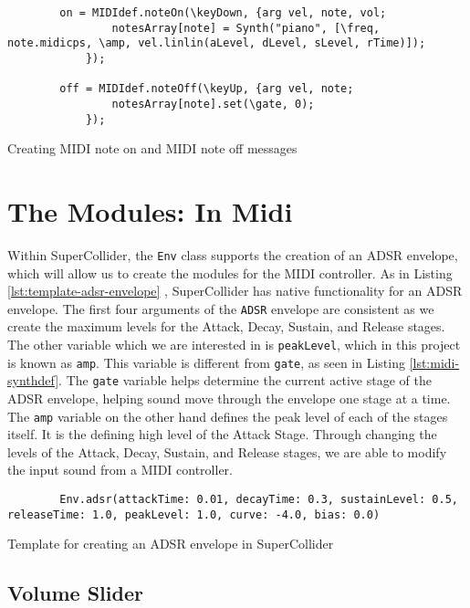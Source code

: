\begin{listing}
	\begin{lstlisting}
		on = MIDIdef.noteOn(\keyDown, {arg vel, note, vol;
				notesArray[note] = Synth("piano", [\freq, note.midicps, \amp, vel.linlin(aLevel, dLevel, sLevel, rTime)]);
			});

		off = MIDIdef.noteOff(\keyUp, {arg vel, note;
				notesArray[note].set(\gate, 0);
			});
	\end{lstlisting}
	\caption{Creating MIDI note on and MIDI note off messages}
	\label{lst:midi-note-on-and-off}	
\end{listing}


\section{The Modules: In Midi}\label{section:the-modules-midi}

Within SuperCollider, the \texttt{Env} class supports the creation of an ADSR envelope, which will allow us to create the modules for the MIDI controller. As in Listing \ref{lst:template-adsr-envelope}  \cite{McCartney_2021}, SuperCollider has native functionality for an ADSR envelope. The first four arguments of the \texttt{ADSR} envelope are consistent as we create the maximum levels for the Attack, Decay, Sustain, and Release stages. The other variable which we are interested in is \texttt{peakLevel}, which in this project is known as \texttt{amp}. This variable is different from \texttt{gate}, as seen in Listing \ref{lst:midi-synthdef}. The \texttt{gate} variable helps determine the current active stage of the ADSR envelope, helping sound move through the envelope one stage at a time. The \texttt{amp} variable on the other hand defines the peak level of each of the stages itself. It is the defining high level of the Attack Stage. Through changing the levels of the Attack, Decay, Sustain, and Release stages, we are able to modify the input sound from a MIDI controller. 

\begin{listing}
	\begin{lstlisting}
		Env.adsr(attackTime: 0.01, decayTime: 0.3, sustainLevel: 0.5, releaseTime: 1.0, peakLevel: 1.0, curve: -4.0, bias: 0.0)
	\end{lstlisting}	
	\caption{Template for creating an ADSR envelope in SuperCollider}
	\label{lst:template-adsr-envelope}
\end{listing}


\subsection{Volume Slider}

